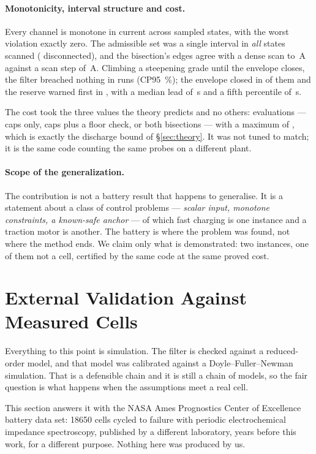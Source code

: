 \documentclass[11pt,letterpaper]{article}
\theoremstyle{definition}
\theoremstyle{remark}
\begin{document}
\paragraph{Monotonicity, interval structure and cost.} Every channel is monotone in current
across \mtStates{} sampled states, with the worst violation exactly zero. The admissible set was
a single interval in \emph{all} \mtScan{} states scanned (\mtDisc{} disconnected), and the
bisection's edges agree with a dense scan to \mtDev\,A against a scan step of \mtStep\,A.
Climbing a steepening grade until the envelope closes, the filter breached nothing in
\mtRuns{} runs (CP95 \mtCP\,\%); the envelope closed in \mtClosed{} of them and the reserve
warned first in \mtWarned, with a median lead of \mtLead\,s and a fifth percentile of
\mtLeadP\,s.

The cost took the three values the theory predicts and no others: \mtPaths{} evaluations ---
caps only, caps plus a floor check, or both bisections --- with a maximum of \mtEvalsMax, which
is exactly the discharge bound of \S\ref{sec:theory}. It was not tuned to match; it is the same
code counting the same probes on a different plant.

\paragraph{Scope of the generalization.} The contribution is not a battery result that happens to
generalise. It is a statement about a class of control problems --- \emph{scalar input, monotone
constraints, a known-safe anchor} --- of which fast charging is one instance and a traction
motor is another. The battery is where the problem was found, not where the method ends. We
claim only what is demonstrated: two instances, one of them not a cell, certified by the same
code at the same proved cost.


\section{External Validation Against Measured Cells}\label{sec:external}

Everything to this point is simulation. The filter is checked against a reduced-order model,
and that model was calibrated against a Doyle--Fuller--Newman simulation. That is a defensible
chain and it is still a chain of models, so the fair question is what happens when the
assumptions meet a real cell.

This section answers it with the NASA Ames Prognostics Center of Excellence battery data set:
\nCells{} 18650 cells cycled to failure with periodic electrochemical impedance spectroscopy,
published by a different laboratory, years before this work, for a different purpose. Nothing
here was produced by us.
\end{document}
